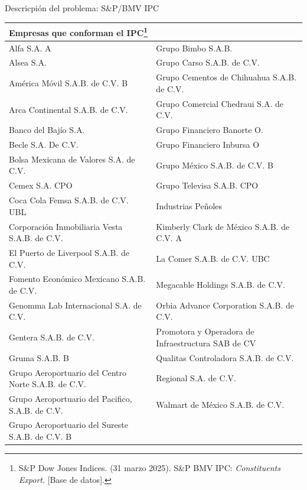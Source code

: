 \documentclass[aspectratio=169,xcolor=dvipsnames]{beamer}
\begin{document}
\begin{frame}{Descricpión del problema: S\&P/BMV IPC}
    \scriptsize %

    \begin{tabularx}{\textwidth}{>{\raggedright\arraybackslash}X >{\raggedright\arraybackslash}X}
    \toprule
    \textbf{Empresas que conforman el IPC\footnote{S\&P Dow Jones Indices. (31 marzo 2025). S\&P BMV IPC: \emph{Constituents Export}. {[}Base de datos{]}.}} \\
    \midrule
    Alfa S.A. A & Grupo Bimbo S.A.B. \\
    Alsea S.A. & Grupo Carso S.A.B. de C.V. \\
    América Móvil S.A.B. de C.V. B & Grupo Cementos de Chihuahua S.A.B. de C.V. \\
    Arca Continental S.A.B. de C.V. & Grupo Comercial Chedraui S.A. de C.V. \\
    Banco del Bajío S.A. & Grupo Financiero Banorte O. \\
    Becle S.A. De C.V. & Grupo Financiero Inbursa O \\
    Bolsa Mexicana de Valores S.A. de C.V. & Grupo México S.A.B. de C.V. B \\
    Cemex S.A. CPO & Grupo Televisa S.A.B. CPO \\
    Coca Cola Femsa S.A.B. de C.V. UBL & Industrias Peñoles \\
    Corporación Inmobiliaria Vesta S.A.B. de C.V. & Kimberly Clark de México S.A.B. de C.V. A \\
    El Puerto de Liverpool S.A.B. de C.V. & La Comer S.A.B. de C.V. UBC \\
    Fomento Económico Mexicano S.A.B. de C.V. & Megacable Holdings S.A.B. de C.V. \\
    Genomma Lab Internacional S.A. de C.V. & Orbia Advance Corporation S.A.B. de C.V. \\
    Gentera S.A.B. de C.V. & Promotora y Operadora de Infraestructura SAB de CV \\
    Gruma S.A.B. B & Qualitas Controladora S.A.B. de C.V. \\
    Grupo Aeroportuario del Centro Norte S.A.B. de C.V. & Regional S.A. de C.V. \\
    Grupo Aeroportuario del Pacifico, S.A.B. de C.V. & Walmart de México S.A.B. de C.V. \\
    Grupo Aeroportuario del Sureste S.A.B. de C.V. B & \\
    \bottomrule
    \end{tabularx}
\end{frame}
\end{document}

